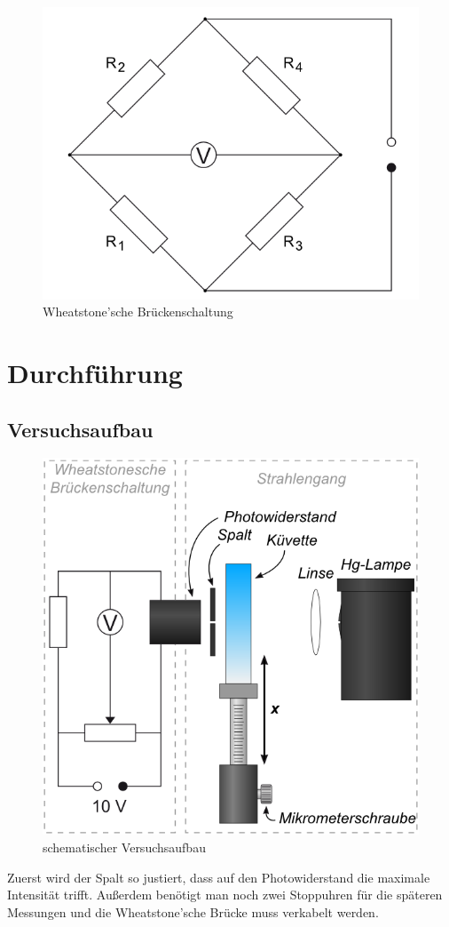 \documentclass[12pt,a4paper,titlepage,headinclude,bibtotoc]{scrartcl}
\begin{document}
\begin{figure}[!htb]
	\centering	
	\includegraphics[scale=0.6]{Brueckenschaltung.png}
	\caption{Wheatstone'sche Brückenschaltung \cite{lp}}
	\label{fig:bruecke}
\end{figure}


\section{Durchführung}
\label{sec:durchfuehrung}
\subsection{Versuchsaufbau}
\begin{figure}[!htb]
	\centering	
	\includegraphics[scale=0.7]{Aufbau_schematisch.png}
	\caption{schematischer Versuchsaufbau \cite{lp}}
\end{figure}
Zuerst wird der Spalt so justiert, dass auf den Photowiderstand die maximale Intensität trifft.
Außerdem benötigt man noch zwei Stoppuhren für die späteren Messungen und die Wheatstone'sche Brücke muss verkabelt werden.
\end{document}
